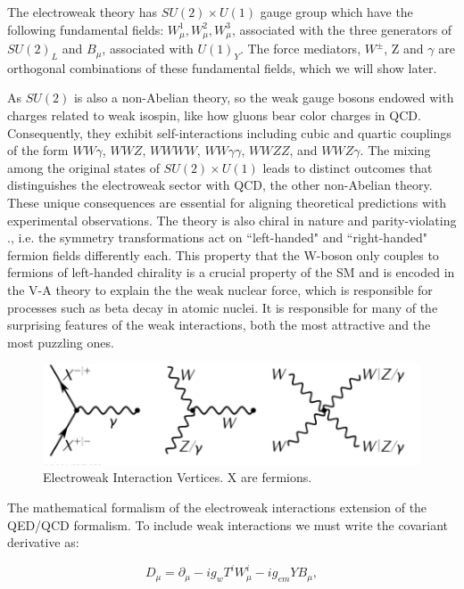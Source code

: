 The electroweak theory  has  $SU(2) \times U(1)$ gauge group which have the following fundamental fields: $W^1_{\mu}, W^2_{\mu}, W^3_{\mu}$, associated with the three generators of $SU(2)_{L}$ and $B_{\mu}$, associated with $U(1)_{Y}$. The force mediators, $W^{\pm}$, Z and $\gamma$ are orthogonal combinations of these fundamental fields, which we will show later.

As $SU(2)$ is also a non-Abelian theory, so the weak gauge bosons endowed with charges related to weak isospin, like how gluons bear color charges in QCD. Consequently, they exhibit self-interactions including cubic and quartic couplings of the form $WW\gamma$, $W W Z$, $W W W W$, $W W \gamma\gamma$, $W W ZZ$, and $W W Z\gamma$. The mixing among the original states of $SU(2) \times U(1)$ leads to distinct outcomes that distinguishes the electroweak sector with QCD, the other non-Abelian theory. These unique consequences are essential for aligning theoretical predictions with experimental observations. The theory is also chiral in nature and parity-violating  \cite{Kobayashi:1973fv}., i.e. the symmetry transformations act on ``left-handed" and ``right-handed" fermion fields differently each. This property that the W-boson only couples to fermions of left-handed chirality is a crucial property of the SM and is encoded in the V-A theory\cite{ParticleDataGroup:2018ovx} to explain the the weak nuclear force, which is responsible for processes such as beta decay in atomic nuclei. It is responsible for many of the surprising features of the weak interactions, both the most attractive and the most puzzling ones. 

\begin{figure}[!htbp]
	\centering
    \includegraphics[scale=1.0]{fig/ElectroweakVertices.png}
	\caption{Electroweak Interaction Vertices. X are fermions.}
	\label{fig:Electroweak}
\end{figure}

The mathematical formalism of the electroweak interactions extension of the QED/QCD formalism. To include weak interactions we must write the covariant derivative as:

\begin{equation}
    \label{eq:CovariantDerivativeElectroWeak}
    D_\mu = \partial_\mu - ig_wT^{i}W_{\mu}^{i} - ig_{em}YB_{\mu}, 
\end{equation}

